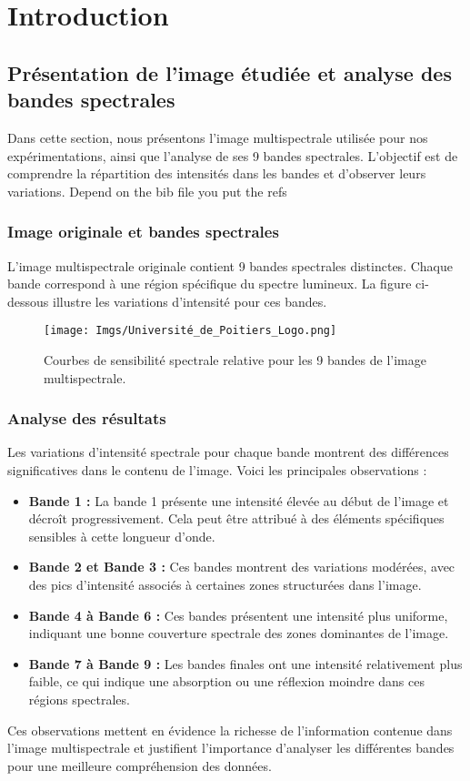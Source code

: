 \chapter{Introduction}
\section{Présentation de l'image étudiée et analyse des bandes spectrales}

Dans cette section, nous présentons l'image multispectrale utilisée pour nos expérimentations, ainsi que l'analyse de ses 9 bandes spectrales. L'objectif est de comprendre la répartition des intensités dans les bandes et d'observer leurs variations. Depend on the bib file you put the refs \cite{islam2012artificial}

\subsection{Image originale et bandes spectrales}

L'image multispectrale originale contient 9 bandes spectrales distinctes. Chaque bande correspond à une région spécifique du spectre lumineux. La figure ci-dessous illustre les variations d'intensité pour ces bandes.

\begin{figure}[H]
    \centering
    \texttt{[image: Imgs/Université\_de\_Poitiers\_Logo.png]}
    \caption{Courbes de sensibilité spectrale relative pour les 9 bandes de l'image multispectrale.}
    \label{fig:multispectral_bands}
\end{figure}

\subsection{Analyse des résultats}

Les variations d'intensité spectrale pour chaque bande montrent des différences significatives dans le contenu de l'image. Voici les principales observations :
\begin{itemize}
    \item \textbf{Bande 1 :} La bande 1 présente une intensité élevée au début de l'image et décroît progressivement. Cela peut être attribué à des éléments spécifiques sensibles à cette longueur d'onde.
    \item \textbf{Bande 2 et Bande 3 :} Ces bandes montrent des variations modérées, avec des pics d'intensité associés à certaines zones structurées dans l'image.
    \item \textbf{Bande 4 à Bande 6 :} Ces bandes présentent une intensité plus uniforme, indiquant une bonne couverture spectrale des zones dominantes de l'image.
    \item \textbf{Bande 7 à Bande 9 :} Les bandes finales ont une intensité relativement plus faible, ce qui indique une absorption ou une réflexion moindre dans ces régions spectrales.
\end{itemize}

Ces observations mettent en évidence la richesse de l'information contenue dans l'image multispectrale et justifient l'importance d'analyser les différentes bandes pour une meilleure compréhension des données.
